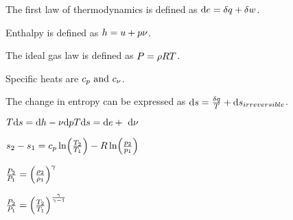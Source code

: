 \documentclass[12pt, letterpaper]{article}
\begin{document}
    The first law of thermodynamics is defined as $\firstlaw$.

    Enthalpy is defined as $\enthalpy$.

    The ideal gas law is defined as $\idealgas$.

    Specific heats are $c_p \ \textrm{and} \ \cv$.

    The change in entropy can be expressed as $\dentropy$.

        $\gibbseqns$

        $\ds$

        $\isenprho$

        $\isenpt$
\end{document}
